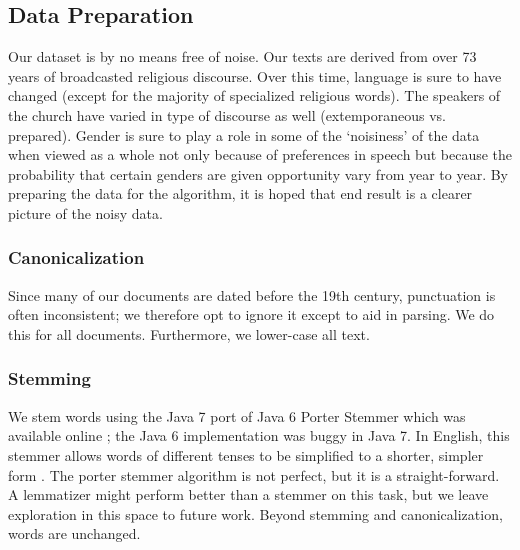 \subsection{Data Preparation}
Our dataset is by no means free of noise. Our texts are derived from over 73 years of broadcasted religious discourse. Over this time, language is sure to have changed (except for the majority of specialized religious words). The speakers of the church have varied in type of discourse as well (extemporaneous vs. prepared). Gender is sure to play a role in some of the `noisiness' of the data when viewed as a whole not only because of preferences in speech but because the probability that certain genders are given opportunity vary from year to year. By preparing the data for the algorithm, it is hoped that end result is a clearer picture of the noisy data.





\subsubsection{Canonicalization}
Since many of our documents are dated before the 19th century, punctuation is often inconsistent; we therefore opt to ignore it except to aid in parsing. We do this for all documents. Furthermore, we lower-case all text. %

\subsubsection{Stemming}
We stem words using the Java 7 port of Java 6 Porter Stemmer which was available online \cite{github-bean5-porter7}; the Java 6 implementation was buggy in Java 7. In English, this stemmer allows words of different tenses to be simplified to a shorter, simpler form \cite{van1980new}. The porter stemmer algorithm is not perfect, but it is a straight-forward. A lemmatizer might perform better than a stemmer on this task, but we leave exploration in this space to future work. Beyond stemming and canonicalization, words are unchanged.

